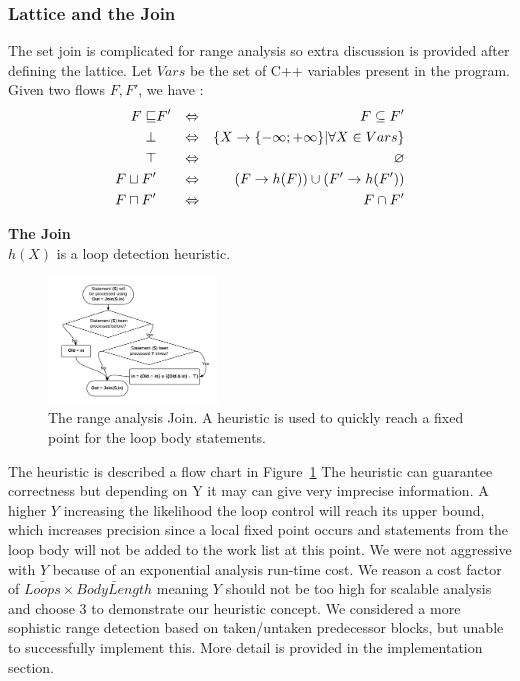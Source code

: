 \subsubsection{Lattice and the Join}
The set join is complicated for range analysis so extra discussion is provided after defining the lattice.
Let $Vars$ be the set of C++ variables present in the program. Given two flows $F,F'$, we have :
\begin{align*}
F \sqsubseteq & F'  & \Leftrightarrow & & F \subseteq F' \\
\bot & & \Leftrightarrow & & \{ X \rightarrow \{-\infty; +\infty\} | \forall X \in Vars \}\\ 
\top & & \Leftrightarrow & & \varnothing \\ 
F \sqcup F' & & \Leftrightarrow & & (F \rightarrow h(F)) \cup (F'\rightarrow h(F')) \\
F \sqcap F' & & \Leftrightarrow & & F \cap F'
\end{align*}

\textbf{The Join}\\
$h(X)$ is a loop detection heuristic. 
\begin{figure}[here]
\includegraphics[width=0.4\textwidth]{loopDetector}
\caption{The range analysis Join. A heuristic is used to quickly reach a fixed point for the loop body statements.}
\label{LoopDetectHeuristic}
\end{figure}

The heuristic is described a flow chart in Figure~\ref{LoopDetectHeuristic}
The heuristic can guarantee correctness but depending on Y it may can give very imprecise information. A higher $Y$ increasing the likelihood the loop control will reach its upper bound, which increases precision since a local fixed point occurs and statements from the loop body will not be added to the work list at this point. We were not aggressive with $Y$ because of an exponential analysis run-time cost. We reason a cost factor of $\bar{Loops} \times \bar{BodyLength}$ meaning $Y$ should not be too high for scalable analysis and choose 3 to demonstrate our heuristic concept. We considered a more sophistic range detection based on taken/untaken predecessor blocks, but unable to successfully implement this. More detail is provided in the implementation section.

